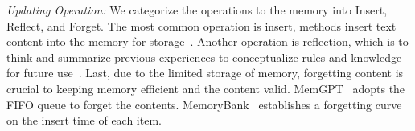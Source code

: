\documentclass[sn-basic, Numbered]{sn-jnl}%
\theoremstyle{thmstyleone}%
\theoremstyle{thmstyletwo}%
\theoremstyle{thmstylethree}%
\begin{document}
\textit{Updating Operation:} We categorize the operations to the memory into Insert, Reflect, and Forget. The most common operation is insert, methods insert text content into the memory for storage~\cite{li2023mot, yang2023failures, zhong2024memorybank, packer2023memgpt, liu2023think, wang2024memory}.
Another operation is reflection, which is to think and summarize previous experiences to conceptualize rules and knowledge for future use~\cite{yang2023failures, zhong2024memorybank, wang2024memory, qian2024investigate}.
Last, due to the limited storage of memory, forgetting content is crucial to keeping memory efficient and the content valid. 
MemGPT~\cite{packer2023memgpt} adopts the FIFO queue to forget the contents.
MemoryBank~\cite{zhong2024memorybank} establishes a forgetting curve on the insert time of each item.






\end{document}
